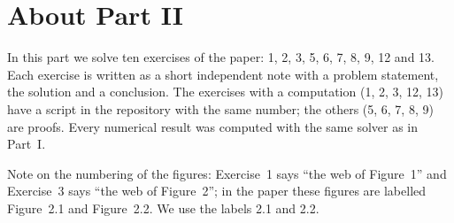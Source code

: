 \section*{About Part II}

In this part we solve ten exercises of the paper: 1, 2, 3, 5, 6, 7, 8, 9, 12 and 13.
Each exercise is written as a short independent note with a problem statement, the solution and a conclusion.
The exercises with a computation (1, 2, 3, 12, 13) have a script in the repository with the same number; the others (5, 6, 7, 8, 9) are proofs.
Every numerical result was computed with the same solver as in Part~I.

Note on the numbering of the figures: Exercise~1 says ``the web of Figure~1'' and Exercise~3 says ``the web of Figure~2''; in the paper these figures are labelled Figure~2.1 and Figure~2.2.
We use the labels 2.1 and 2.2.
